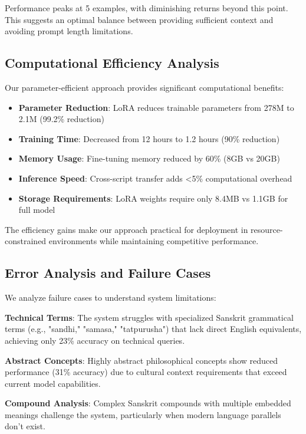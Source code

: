 \documentclass[runningheads]{llncs}
\begin{document}
Performance peaks at 5 examples, with diminishing returns beyond this point. This suggests an optimal balance between providing sufficient context and avoiding prompt length limitations.

\subsection{Computational Efficiency Analysis}

Our parameter-efficient approach provides significant computational benefits:

\begin{itemize}
\item \textbf{Parameter Reduction}: LoRA reduces trainable parameters from 278M to 2.1M (99.2\% reduction)
\item \textbf{Training Time}: Decreased from 12 hours to 1.2 hours (90\% reduction)
\item \textbf{Memory Usage}: Fine-tuning memory reduced by 60\% (8GB vs 20GB)
\item \textbf{Inference Speed}: Cross-script transfer adds <5\% computational overhead
\item \textbf{Storage Requirements}: LoRA weights require only 8.4MB vs 1.1GB for full model
\end{itemize}

The efficiency gains make our approach practical for deployment in resource-constrained environments while maintaining competitive performance.

\subsection{Error Analysis and Failure Cases}

We analyze failure cases to understand system limitations:

\textbf{Technical Terms}: The system struggles with specialized Sanskrit grammatical terms (e.g., "sandhi," "samasa," "tatpurusha") that lack direct English equivalents, achieving only 23\% accuracy on technical queries.

\textbf{Abstract Concepts}: Highly abstract philosophical concepts show reduced performance (31\% accuracy) due to cultural context requirements that exceed current model capabilities.

\textbf{Compound Analysis}: Complex Sanskrit compounds with multiple embedded meanings challenge the system, particularly when modern language parallels don't exist.
\end{document}
